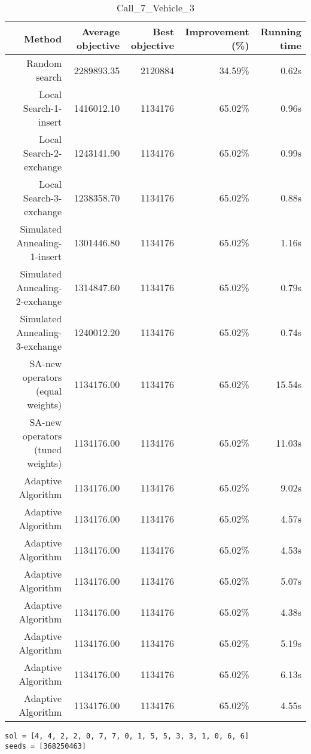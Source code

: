 \begin{table}[ht]
\centering
\caption{Call\_7\_Vehicle\_3}
\label{tab:call7vehicle3}
\begin{tabular}{|r|r|r|r|r|}
Method & Average objective & Best objective & Improvement (\%) & Running time \\
\hline
Random search & 2289893.35 & 2120884 & 34.59\% & 0.62s\\
Local Search-1-insert & 1416012.10 & 1134176 & 65.02\% & 0.96s\\
Local Search-2-exchange & 1243141.90 & 1134176 & 65.02\% & 0.99s\\
Local Search-3-exchange & 1238358.70 & 1134176 & 65.02\% & 0.88s\\
Simulated Annealing-1-insert & 1301446.80 & 1134176 & 65.02\% & 1.16s\\
Simulated Annealing-2-exchange & 1314847.60 & 1134176 & 65.02\% & 0.79s\\
Simulated Annealing-3-exchange & 1240012.20 & 1134176 & 65.02\% & 0.74s\\
SA-new operators (equal weights) & 1134176.00 & 1134176 & 65.02\% & 15.54s\\
SA-new operators (tuned weights) & 1134176.00 & 1134176 & 65.02\% & 11.03s\\
Adaptive Algorithm & 1134176.00 & 1134176 & 65.02\% & 9.02s\\
Adaptive Algorithm & 1134176.00 & 1134176 & 65.02\% & 4.57s\\
Adaptive Algorithm & 1134176.00 & 1134176 & 65.02\% & 4.53s\\
Adaptive Algorithm & 1134176.00 & 1134176 & 65.02\% & 5.07s\\
Adaptive Algorithm & 1134176.00 & 1134176 & 65.02\% & 4.38s\\
Adaptive Algorithm & 1134176.00 & 1134176 & 65.02\% & 5.19s\\
Adaptive Algorithm & 1134176.00 & 1134176 & 65.02\% & 6.13s\\
Adaptive Algorithm & 1134176.00 & 1134176 & 65.02\% & 4.55s\\
\end{tabular}%
\end{table}
\begin{lstlisting}[label={lst:call7vehicle3},caption=Optimal solution call\_7\_vehicle\_3]
sol = [4, 4, 2, 2, 0, 7, 7, 0, 1, 5, 5, 3, 3, 1, 0, 6, 6]
seeds = [368250463]
\end{lstlisting}%
\clearpage


